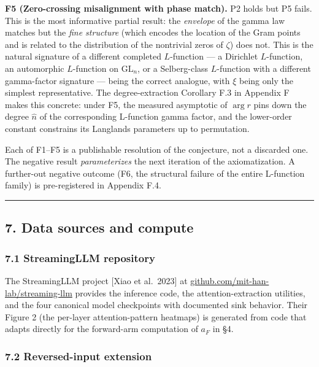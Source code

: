 \documentclass[
  letterpaper,
  11pt]{article}
\theoremstyle{plain}
\theoremstyle{definition}
\theoremstyle{remark}
\begin{document}
\textbf{F5 (Zero-crossing misalignment with phase match).} P2 holds but P5 fails. This is the most informative partial result: the \emph{envelope} of the gamma law matches but the \emph{fine structure} (which encodes the location of the Gram points and is related to the distribution of the nontrivial zeros of \(\zeta\)) does not. This is the natural signature of a different completed \(L\)-function --- a Dirichlet \(L\)-function, an automorphic \(L\)-function on \(\mathrm{GL}_n\), or a Selberg-class \(L\)-function with a different gamma-factor signature --- being the correct analogue, with \(\xi\) being only the simplest representative. The degree-extraction Corollary F.3 in Appendix F makes this concrete: under F5, the measured asymptotic of \(\arg r\) pins down the degree \(\hat n\) of the corresponding L-function gamma factor, and the lower-order constant constrains its Langlands parameters up to permutation.

Each of F1--F5 is a publishable resolution of the conjecture, not a discarded one. The negative result \emph{parameterizes} the next iteration of the axiomatization. A further-out negative outcome (F6, the structural failure of the entire L-function family) is pre-registered in Appendix F.4.

\begin{center}\rule{0.5\linewidth}{0.5pt}\end{center}

\subsection{7. Data sources and compute}\label{data-sources-and-compute}

\subsubsection{7.1 StreamingLLM repository}\label{streamingllm-repository}

The StreamingLLM project {[}Xiao et al.~2023{]} at \href{https://github.com/mit-han-lab/streaming-llm}{github.com/mit-han-lab/streaming-llm} provides the inference code, the attention-extraction utilities, and the four canonical model checkpoints with documented sink behavior. Their Figure 2 (the per-layer attention-pattern heatmaps) is generated from code that adapts directly for the forward-arm computation of \(a_F\) in §4.

\subsubsection{7.2 Reversed-input extension}\label{reversed-input-extension}
\end{document}
